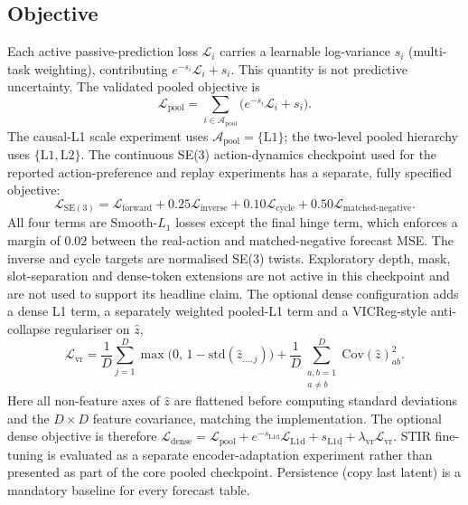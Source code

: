 \documentclass[preprint,12pt]{elsarticle}
\begin{document}
\subsection{Objective}
\label{sec:objective}
Each active passive-prediction loss $\mathcal{L}_i$ carries a learnable
log-variance $s_i$ (multi-task weighting), contributing
$e^{-s_i}\mathcal{L}_i+s_i$. This quantity is not predictive uncertainty. The
validated pooled objective is
\begin{equation}
\mathcal{L}_{\mathrm{pool}}
=
\sum_{i\in\mathcal{A}_{\mathrm{pool}}}
\bigl(e^{-s_i}\mathcal{L}_i+s_i\bigr).
\label{eq:obj}
\end{equation}
The causal-L1 scale experiment uses
$\mathcal{A}_{\mathrm{pool}}=\{\mathrm{L1}\}$; the two-level pooled hierarchy
uses $\{\mathrm{L1},\mathrm{L2}\}$.
The continuous SE(3) action-dynamics checkpoint used for the reported
action-preference and replay experiments has a separate, fully specified
objective:
\begin{equation}
\mathcal{L}_{\mathrm{SE(3)}} =
\mathcal{L}_{\mathrm{forward}}+
0.25\mathcal{L}_{\mathrm{inverse}}+
0.10\mathcal{L}_{\mathrm{cycle}}+
0.50\mathcal{L}_{\mathrm{matched\text{-}negative}}.
\label{eq:se3-objective}
\end{equation}
All four terms are Smooth-$L_1$ losses except the final hinge term, which
enforces a margin of $0.02$ between the real-action and matched-negative
forecast MSE. The inverse and cycle targets are normalised SE(3) twists.
Exploratory depth, mask, slot-separation and dense-token extensions are not
active in this checkpoint and are not used to support its headline claim.
The optional dense configuration adds a dense L1 term, a separately weighted
pooled-L1 term and a VICReg-style anti-collapse regulariser on $\hat z$,
\begin{equation}
\mathcal{L}_{\mathrm{vr}}
=
\frac{1}{D}\sum_{j=1}^{D}\max\bigl(0,\,1-\mathrm{std}(\hat z_{\ldots,j})\bigr)
+
\frac{1}{D}\sum_{\substack{a,b=1\\a\neq b}}^{D}
\mathrm{Cov}(\hat z)_{ab}^{2}.
\label{eq:vicreg}
\end{equation}
Here all non-feature axes of $\hat z$ are flattened before computing standard
deviations and the $D{\times}D$ feature covariance, matching the implementation.
The optional dense objective is therefore
$\mathcal{L}_{\mathrm{dense}}=
\mathcal{L}_{\mathrm{pool}}+
e^{-s_{\mathrm{L1d}}}\mathcal{L}_{\mathrm{L1d}}+
s_{\mathrm{L1d}}+\lambda_{\mathrm{vr}}\mathcal{L}_{\mathrm{vr}}$.
STIR fine-tuning is evaluated as a separate encoder-adaptation experiment
rather than presented as part of the core pooled checkpoint.
Persistence (copy last latent) is a mandatory baseline for every forecast table.
\end{document}
